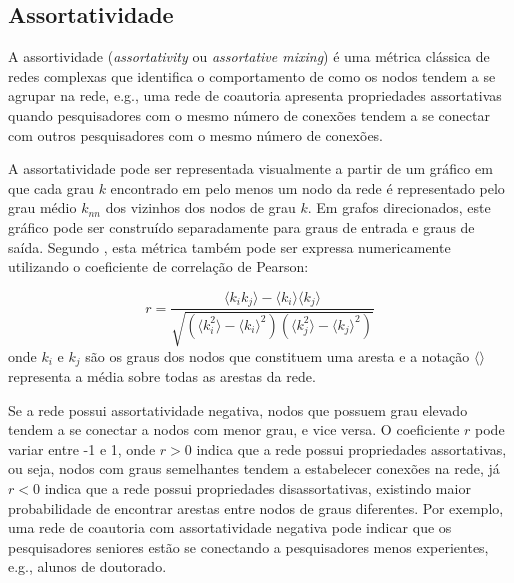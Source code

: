 \subsection{Assortatividade}

A assortividade (\textit{assortativity} ou \textit{assortative mixing}) é uma métrica clássica de redes complexas que identifica
o comportamento de como os nodos tendem a se agrupar na rede, e.g., uma rede de coautoria apresenta propriedades assortativas 
quando pesquisadores com o mesmo número de conexões tendem a se conectar com outros pesquisadores com o mesmo número de conexões.

A assortatividade pode ser representada visualmente a partir de um gráfico em que cada grau $k$ encontrado em pelo menos um
nodo da rede é representado pelo grau médio $k_{nn}$ dos vizinhos dos nodos de grau $k$. Em grafos direcionados, este gráfico pode
ser construído separadamente para graus de entrada e graus de saída. Segundo \cite{Ahn2007}, esta métrica também pode ser expressa 
numericamente utilizando o coeficiente de correlação de Pearson:

\begin{equation}
\label{eq:assortatividade}
r = \frac{\langle k_ik_j \rangle-\langle k_i \rangle \langle k_j \rangle }
         {\sqrt{(\langle k^2_i \rangle - \langle k_i \rangle^2)(\langle k^2_j \rangle - \langle k_j \rangle^2)}}
\end{equation}
onde $k_i$ e $k_j$ são os graus dos nodos que constituem uma aresta e a notação $\langle \rangle$ representa a média sobre 
todas as arestas da rede.

Se a rede possui assortatividade negativa, nodos que possuem grau elevado tendem a se conectar a nodos com menor grau,
e vice versa. O coeficiente $r$ pode variar entre -1 e 1, onde $r > 0$ indica que a rede possui propriedades assortativas,
ou seja, nodos com graus semelhantes tendem a estabelecer conexões na rede, já $r < 0$ indica que a rede possui
propriedades disassortativas, existindo maior probabilidade de encontrar arestas entre nodos de graus diferentes.
Por exemplo, uma rede de coautoria com assortatividade negativa pode indicar que os pesquisadores seniores estão se
conectando a pesquisadores menos experientes, e.g., alunos de doutorado.